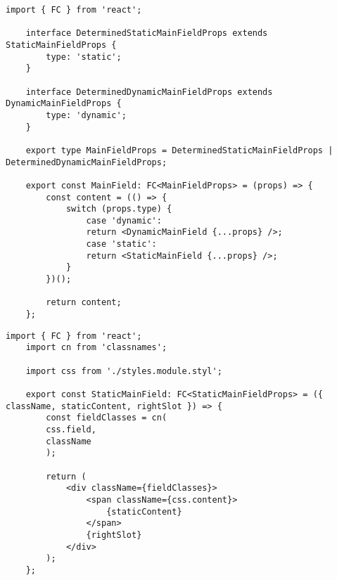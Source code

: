 \begin{lstlisting}[caption={MainField.tsx}]
	import { FC } from 'react';
	
	interface DeterminedStaticMainFieldProps extends StaticMainFieldProps {
		type: 'static';
	}
	
	interface DeterminedDynamicMainFieldProps extends DynamicMainFieldProps {
		type: 'dynamic';
	}
	
	export type MainFieldProps = DeterminedStaticMainFieldProps | DeterminedDynamicMainFieldProps;
	
	export const MainField: FC<MainFieldProps> = (props) => {
		const content = (() => {
			switch (props.type) {
				case 'dynamic':
				return <DynamicMainField {...props} />;
				case 'static':
				return <StaticMainField {...props} />;
			}
		})();
		
		return content;
	};
\end{lstlisting}

\begin{lstlisting}[caption={StaticMainField.tsx}]
	import { FC } from 'react';
	import cn from 'classnames';
	
	import css from './styles.module.styl';
	
	export const StaticMainField: FC<StaticMainFieldProps> = ({ className, staticContent, rightSlot }) => {
		const fieldClasses = cn(
		css.field,
		className
		);    
		
		return (
			<div className={fieldClasses}>
				<span className={css.content}>
					{staticContent}
				</span>
				{rightSlot}
			</div>
		);
	};
\end{lstlisting}

